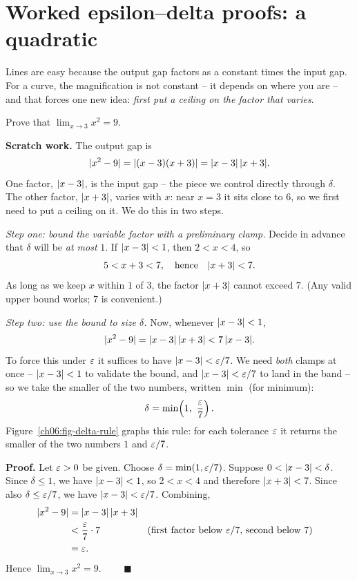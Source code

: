 \section{Worked epsilon--delta proofs: a quadratic}
\label{ch06:quadratic}

Lines are easy because the output gap factors as a constant times the
input gap. For a curve, the magnification is not constant -- it depends on where
you are -- and that forces one new idea: \emph{first put a ceiling on the factor
that varies}.

\begin{example}
\label{ch06:ex-quad}
Prove that $\displaystyle \lim_{x\to 3} x^2 = 9$.
\end{example}

\textbf{Scratch work.} The output gap is
\[
  \lvert x^2 - 9\rvert = \lvert(x-3)(x+3)\rvert = \lvert x-3\rvert\,\lvert x+3\rvert.
\]
One factor, $\lvert x-3\rvert$, is the input gap -- the piece we control directly through
$\delta$. The other factor, $\lvert x+3\rvert$, varies with $x$: near $x=3$ it sits close to $6$,
so we first need to put a ceiling on it. We do this in two steps.

\emph{Step one: bound the variable factor with a preliminary clamp.} Decide in advance
that $\delta$ will be \emph{at most} $1$. If $\lvert x-3\rvert<1$, then $2<x<4$, so
\[
  5 < x+3 < 7, \quad\text{hence}\quad \lvert x+3\rvert < 7.
\]
As long as we keep $x$ within $1$ of $3$, the factor $\lvert x+3\rvert$ cannot exceed $7$.
(Any valid upper bound works; $7$ is convenient.)

\emph{Step two: use the bound to size $\delta$.} Now, whenever $\lvert x-3\rvert<1$,
\[
  \lvert x^2-9\rvert = \lvert x-3\rvert\,\lvert x+3\rvert < 7\,\lvert x-3\rvert.
\]
To force this under $\varepsilon$ it suffices to have $\lvert x-3\rvert < \varepsilon/7$. We need
\emph{both} clamps at once -- $\lvert x-3\rvert<1$ to validate the bound, and
$\lvert x-3\rvert<\varepsilon/7$ to land in the band -- so we take the smaller of the two
numbers, written $\min$ (for minimum):
\[
  \delta = \min\!\left(1,\ \frac{\eps}{7}\right).
\]
Figure~\ref{ch06:fig-delta-rule} graphs this rule: for each tolerance $\varepsilon$ it
returns the smaller of the two numbers $1$ and $\varepsilon/7$.

\textbf{Proof.} Let $\varepsilon>0$ be given. Choose $\delta = \min(1,\varepsilon/7)$. Suppose
$0<\lvert x-3\rvert<\delta$. Since $\delta\le 1$, we have $\lvert x-3\rvert<1$, so $2<x<4$ and
therefore $\lvert x+3\rvert<7$. Since also $\delta\le\varepsilon/7$, we have $\lvert x-3\rvert<\varepsilon/7$.
Combining,
\begin{align*}
  \lvert x^2 - 9\rvert &= \lvert x-3\rvert\,\lvert x+3\rvert \\
  &< \frac{\varepsilon}{7}\cdot 7 && \text{(first factor below $\varepsilon/7$, second below $7$)} \\
  &= \varepsilon.
\end{align*}
Hence $\lim_{x\to 3} x^2 = 9$. $\qquad\blacksquare$

